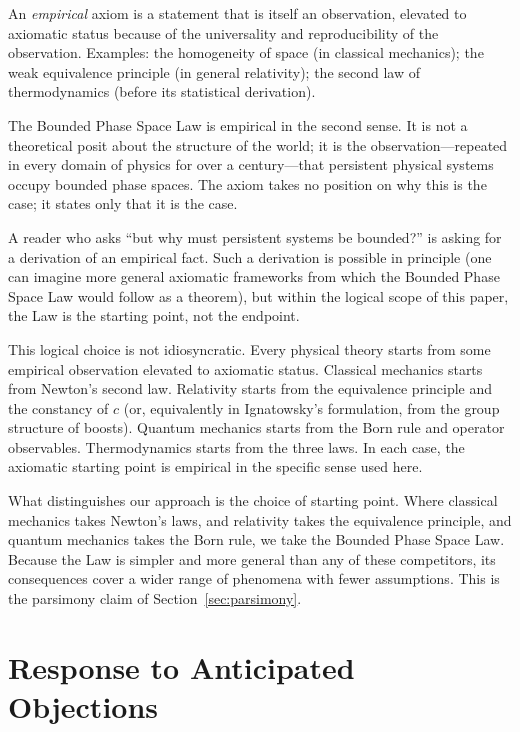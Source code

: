 \documentclass[11pt,twocolumn,a4paper]{article}
\theoremstyle{axiomstyle}
\theoremstyle{conseqstyle}
\theoremstyle{definition}
\theoremstyle{remark}
\begin{document}
An \emph{empirical} axiom is a statement that is itself an observation, elevated to axiomatic status because of the universality and reproducibility of the observation. Examples: the homogeneity of space (in classical mechanics); the weak equivalence principle (in general relativity); the second law of thermodynamics (before its statistical derivation).

The Bounded Phase Space Law is empirical in the second sense. It is not a theoretical posit about the structure of the world; it is the observation---repeated in every domain of physics for over a century---that persistent physical systems occupy bounded phase spaces. The axiom takes no position on why this is the case; it states only that it is the case.

A reader who asks ``but why must persistent systems be bounded?'' is asking for a derivation of an empirical fact. Such a derivation is possible in principle (one can imagine more general axiomatic frameworks from which the Bounded Phase Space Law would follow as a theorem), but within the logical scope of this paper, the Law is the starting point, not the endpoint.

This logical choice is not idiosyncratic. Every physical theory starts from some empirical observation elevated to axiomatic status. Classical mechanics starts from Newton's second law. Relativity starts from the equivalence principle and the constancy of $c$ (or, equivalently in Ignatowsky's formulation, from the group structure of boosts). Quantum mechanics starts from the Born rule and operator observables. Thermodynamics starts from the three laws. In each case, the axiomatic starting point is empirical in the specific sense used here.

What distinguishes our approach is the choice of starting point. Where classical mechanics takes Newton's laws, and relativity takes the equivalence principle, and quantum mechanics takes the Born rule, we take the Bounded Phase Space Law. Because the Law is simpler and more general than any of these competitors, its consequences cover a wider range of phenomena with fewer assumptions. This is the parsimony claim of Section~\ref{sec:parsimony}.

\section{Response to Anticipated Objections}
\label{app:objections}
\end{document}
